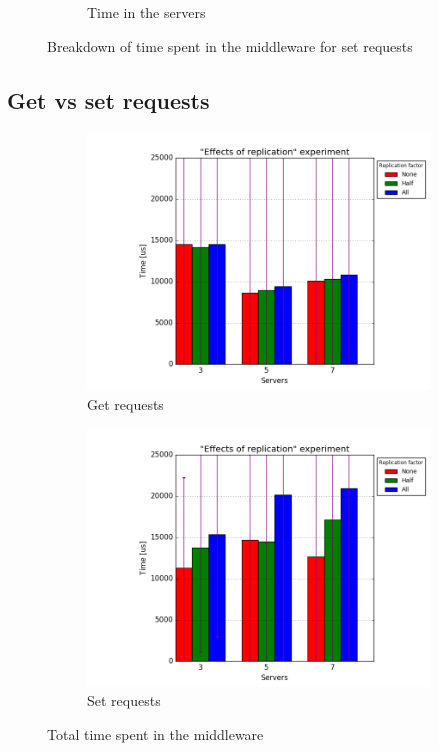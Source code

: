 \documentclass[11pt]{article}
\begin{document}
\begin{figure}
\begin{subfigure}{.5\textwidth}
	\caption{Time in the servers}
	\label{fig:replication-set-servers}
\end{subfigure}
\caption{Breakdown of time spent in the middleware for set requests}
\label{fig:replication-set-breakdown}
\end{figure}

\subsection{Get vs set requests}
\label{sec:replication-get-set}

\begin{figure}
\centering
\begin{subfigure}{.5\textwidth}
	\centering
	\includegraphics[width=\linewidth]{plots/replication-get-scaled}
	\caption{Get requests}
\end{subfigure}%
\begin{subfigure}{.5\textwidth}
	\centering
	\includegraphics[width=\linewidth]{plots/replication-set-scaled}
	\caption{Set requests}
\end{subfigure}
\caption{Total time spent in the middleware}
\label{fig:replication-set-get}
\end{figure}
\end{document}
